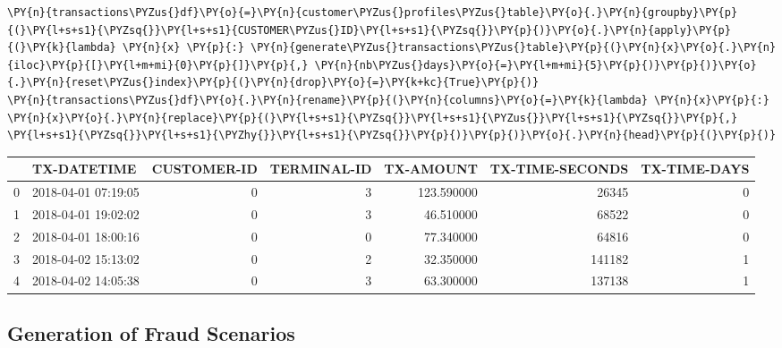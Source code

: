     \begin{tcolorbox}[breakable, size=fbox, boxrule=1pt, pad at break*=1mm,colback=cellbackground, colframe=cellborder]
\begin{Verbatim}[commandchars=\\\{\}]
\PY{n}{transactions\PYZus{}df}\PY{o}{=}\PY{n}{customer\PYZus{}profiles\PYZus{}table}\PY{o}{.}\PY{n}{groupby}\PY{p}{(}\PY{l+s+s1}{\PYZsq{}}\PY{l+s+s1}{CUSTOMER\PYZus{}ID}\PY{l+s+s1}{\PYZsq{}}\PY{p}{)}\PY{o}{.}\PY{n}{apply}\PY{p}{(}\PY{k}{lambda} \PY{n}{x} \PY{p}{:} \PY{n}{generate\PYZus{}transactions\PYZus{}table}\PY{p}{(}\PY{n}{x}\PY{o}{.}\PY{n}{iloc}\PY{p}{[}\PY{l+m+mi}{0}\PY{p}{]}\PY{p}{,} \PY{n}{nb\PYZus{}days}\PY{o}{=}\PY{l+m+mi}{5}\PY{p}{)}\PY{p}{)}\PY{o}{.}\PY{n}{reset\PYZus{}index}\PY{p}{(}\PY{n}{drop}\PY{o}{=}\PY{k+kc}{True}\PY{p}{)}
\PY{n}{transactions\PYZus{}df}\PY{o}{.}\PY{n}{rename}\PY{p}{(}\PY{n}{columns}\PY{o}{=}\PY{k}{lambda} \PY{n}{x}\PY{p}{:} \PY{n}{x}\PY{o}{.}\PY{n}{replace}\PY{p}{(}\PY{l+s+s1}{\PYZsq{}}\PY{l+s+s1}{\PYZus{}}\PY{l+s+s1}{\PYZsq{}}\PY{p}{,} \PY{l+s+s1}{\PYZsq{}}\PY{l+s+s1}{\PYZhy{}}\PY{l+s+s1}{\PYZsq{}}\PY{p}{)}\PY{p}{)}\PY{o}{.}\PY{n}{head}\PY{p}{(}\PY{p}{)}
\end{Verbatim}
\end{tcolorbox}
 
            
    
    \begin{center}
\small
\begin{tabular}{llrrrrr}
\toprule
 & TX-DATETIME & CUSTOMER-ID & TERMINAL-ID & TX-AMOUNT & TX-TIME-SECONDS & TX-TIME-DAYS \\
\midrule
0 & 2018-04-01 07:19:05 & 0 & 3 & 123.590000 & 26345 & 0 \\
1 & 2018-04-01 19:02:02 & 0 & 3 & 46.510000 & 68522 & 0 \\
2 & 2018-04-01 18:00:16 & 0 & 0 & 77.340000 & 64816 & 0 \\
3 & 2018-04-02 15:13:02 & 0 & 2 & 32.350000 & 141182 & 1 \\
4 & 2018-04-02 14:05:38 & 0 & 3 & 63.300000 & 137138 & 1 \\
\bottomrule
\end{tabular}

\end{center}

    

    \hypertarget{generation-of-fraud-scenarios}{%
\subsection{Generation of Fraud
Scenarios}\label{generation-of-fraud-scenarios}}

